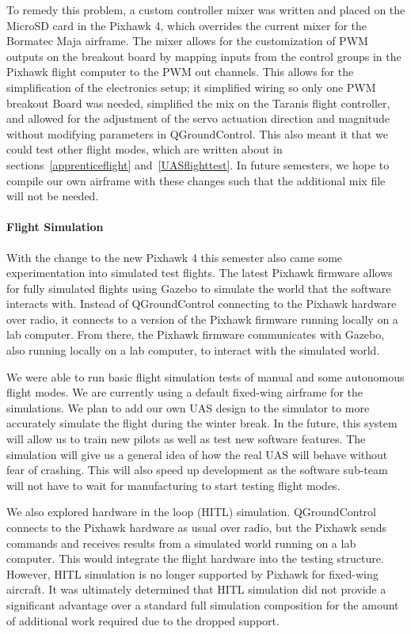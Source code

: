 \documentclass{article}
\begin{document}
To remedy this problem, a custom controller mixer was written and placed on the MicroSD card in the Pixhawk 4, which overrides the current mixer for the Bormatec Maja airframe. The mixer allows for the customization of PWM outputs on the breakout board by mapping inputs from the control groups in the Pixhawk flight computer to the PWM out channels. This allows for the simplification of the electronics setup; it simplified wiring so only one PWM breakout Board was needed, simplified the mix on the Taranis flight controller, and allowed for the adjustment of the servo actuation direction and magnitude without modifying parameters in QGroundControl. This also meant it that we could test other flight modes, which are written about in sections~\ref{apprenticeflight} and~\ref{UASflighttest}. In future semesters, we hope to compile our own airframe with these changes such that the additional mix file will not be needed.

\paragraph{Flight Simulation}\label{simulation}
With the change to the new Pixhawk 4 this semester also came some experimentation into simulated test flights. The latest Pixhawk firmware allows for fully simulated flights using Gazebo to simulate the world that the software interacts with. Instead of QGroundControl connecting to the Pixhawk hardware over radio, it connects to a version of the Pixhawk firmware running locally on a lab computer. From there, the Pixhawk firmware communicates with Gazebo, also running locally on a lab computer, to interact with the simulated world.

We were able to run basic flight simulation tests of manual and some autonomous flight modes. We are currently using a default fixed-wing airframe for the simulations. We plan to add our own UAS design to the simulator to more accurately simulate the flight during the winter break. In the future, this system will allow us to train new pilots as well as test new software features. The simulation will give us a general idea of how the real UAS will behave without fear of crashing. This will also speed up development as the software sub-team will not have to wait for manufacturing to start testing flight modes.

We also explored hardware in the loop (HITL) simulation. QGroundControl connects to the Pixhawk hardware as usual over radio, but the Pixhawk sends commands and receives results from a simulated world running on a lab computer. This would integrate the flight hardware into the testing structure. However, HITL simulation is no longer supported by Pixhawk for fixed-wing aircraft. It was ultimately determined that HITL simulation did not provide a significant advantage over a standard full simulation composition for the amount of additional work required due to the dropped support.
\end{document}
